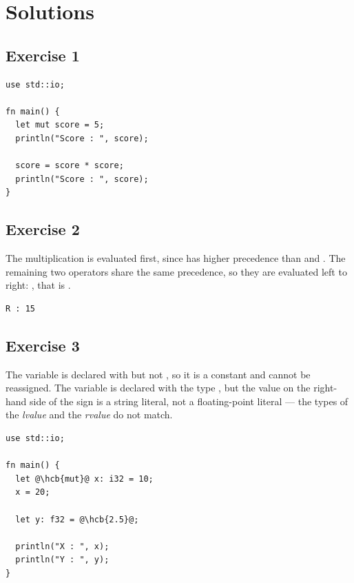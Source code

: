 \vfill%
\pagebreak

\forceevenpage{}

\section*{Solutions}
%
\subsection*{Exercise 1}

\begin{lstlisting}[style=coloredverbatim, caption=Solution for exercise 1]
use std::io;

fn main() {
  let mut score = 5;
  println("Score : ", score);

  score = score * score;
  println("Score : ", score);
}
\end{lstlisting}

\subsection*{Exercise 2}

The multiplication  is evaluated first, since \token{*} has
higher precedence than \token{+} and \token{-}. The remaining two operators
share the same precedence, so they are evaluated left to right:
, that is .

\begin{lstlisting}[style=bashVerb]
R : 15
\end{lstlisting}

\subsection*{Exercise 3}

The variable  is declared with  but not ,
so it is a constant and cannot be reassigned. The variable  is
declared with the type , but the value on the right-hand side of
the \token{=} sign is a string literal, not a floating-point literal — the
types of the \textit{lvalue} and the \textit{rvalue} do not match.

\begin{lstlisting}[style=coloredverbatimCorrect, escapechar=@, caption=Solution for exercise 3]
use std::io;

fn main() {
  let @\hcb{mut}@ x: i32 = 10;
  x = 20;

  let y: f32 = @\hcb{2.5}@;

  println("X : ", x);
  println("Y : ", y);
}
\end{lstlisting}


